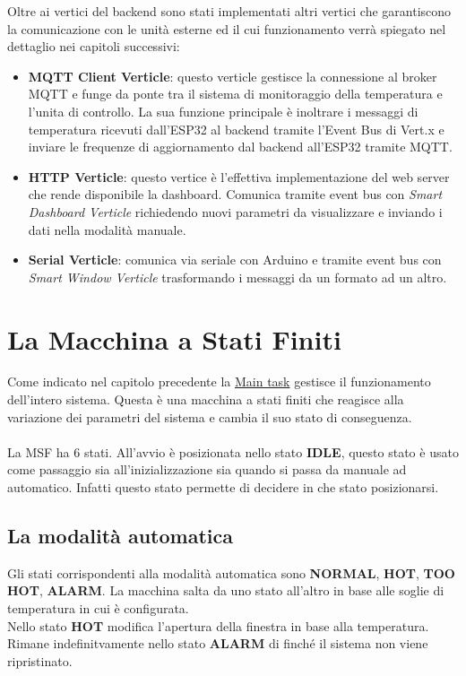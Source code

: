 \documentclass{report}
\begin{document}
Oltre ai vertici del backend sono stati implementati altri vertici che garantiscono la comunicazione con le unità esterne ed il cui funzionamento verrà spiegato nel dettaglio nei capitoli successivi:
\begin{itemize}
    \item {   
    \textbf{MQTT Client Verticle}: questo verticle gestisce la connessione al broker MQTT e funge da ponte tra il sistema di monitoraggio della temperatura e l'unita di controllo. La sua funzione principale è inoltrare i messaggi di temperatura ricevuti dall'ESP32 al backend tramite l'Event Bus di Vert.x e inviare le frequenze di aggiornamento dal backend all'ESP32 tramite MQTT.
    }
    \item {
    \textbf{HTTP Verticle}: questo vertice è l'effettiva implementazione del web server che rende disponibile la dashboard. Comunica tramite event bus con \textit{Smart Dashboard Verticle} richiedendo nuovi parametri da visualizzare e inviando i dati nella modalità manuale.
    }
    \item {
    \textbf{Serial Verticle}: comunica via seriale con Arduino e tramite event bus con \textit{Smart Window Verticle} trasformando i messaggi da un formato ad un altro.
    }
\end{itemize}

\section{La Macchina a Stati Finiti}
Come indicato nel capitolo precedente la \hyperref[fig:main-task]{Main task} gestisce il funzionamento dell'intero sistema. Questa è una macchina a stati finiti che reagisce alla variazione dei parametri del sistema e cambia il suo stato di conseguenza. 
\\
\\
La MSF ha 6 stati. All'avvio è posizionata nello stato \textbf{IDLE}, questo stato è usato come passaggio sia all'inizializzazione sia quando si passa da manuale ad automatico. Infatti questo stato permette di decidere in che stato posizionarsi.

\subsection{La modalità automatica}

\par{
Gli stati corrispondenti alla modalità automatica sono \textbf{NORMAL}, \textbf{HOT}, \textbf{TOO HOT}, \textbf{ALARM}. La macchina salta da uno stato all'altro in base alle soglie di temperatura in cui è configurata. \\
Nello stato \textbf{HOT} modifica l'apertura della finestra in base alla temperatura. \\
Rimane indefinitvamente nello stato \textbf{ALARM} di finché il sistema non viene ripristinato.
}
\end{document}

